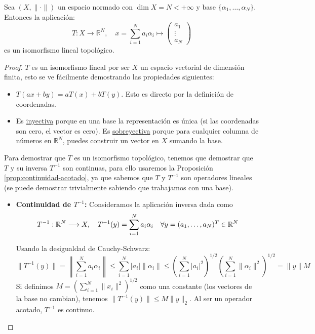 \begin{prop}
    Sea $(X, \|\cdot\|)$ un espacio normado con $\dim X = N < +\infty$ y base $\{\alpha_1, \dots, \alpha_N\}$. Entonces la aplicación:
    \begin{equation*}
        T : X \longrightarrow \mathbb{R}^N, \quad x = \sum_{i=1}^N a_i \alpha_i \mapsto 
        \begin{pmatrix} 
            a_1 \\ 
            \vdots \\ 
            a_N 
        \end{pmatrix}
    \end{equation*}
    es un isomorfismo lineal topológico.
\begin{proof}
    $T$ es un isomorfismo lineal por ser $X$ un espacio vectorial de dimensión finita, esto se ve fácilmente demostrando las propiedades siguientes:
    \begin{itemize}
        \item {} $T(ax + by) = aT(x) + bT(y)$. Esto es directo por la definición de coordenadas.
        \item {} Es \underline{inyectiva} porque en una base la representación es única (si las coordenadas son cero, el vector es cero). Es \underline{sobreyectiva} porque para cualquier columna de números en $\mathbb{R}^N$, puedes construir un vector en $X$ sumando la base.
    \end{itemize}
    Para demostrar que $T$ es un isomorfismo topológico, tenemos que demostrar que $T$ y su inversa $T^{-1}$ son continuas, para ello usaremos la Proposición \ref{prop:continuidad-acotado}, ya que sabemos que $T$ y $T^{-1}$ son operadores lineales (se puede demostrar trivialmente sabiendo que trabajamos con una base).
    \begin{itemize}        
        \item \textbf{Continuidad de $T^{-1}$:} Consideramos la aplicación inversa dada como 
        $$T^{-1} : \mathbb{R}^N \longrightarrow X, \quad T^{-1}(y) = \sum_{i=1}^N a_i \alpha_i\quad \forall y = (a_1, \dots, a_N)^T\in \mathbb{R}^N$$
        
        Usando la desigualdad de Cauchy-Schwarz:
        \begin{equation*}
            \|T^{-1}(y)\| = \left\| \sum_{i=1}^N a_i \alpha_i \right\| \leq \sum_{i=1}^N |a_i| \|\alpha_i\|\leq \left( \sum_{i=1}^N |a_i|^2 \right)^{1/2} \left( \sum_{i=1}^N \|\alpha_i\|^2 \right)^{1/2}= \|y\| M
        \end{equation*}
        Si definimos $M = (\sum\limits_{i=1}^N \|x_i\|^2)^{1/2}$ como una constante (los vectores de la base no cambian), tenemos $\|T^{-1}(y)\| \leq M \|y\|_2$. Al ser un operador acotado, $T^{-1}$ es continuo.


\end{itemize}
\end{proof}
\end{prop}
